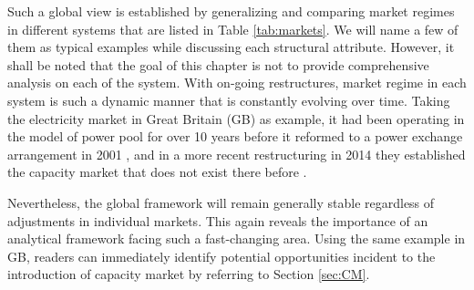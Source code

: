 Such a global view is established by generalizing and comparing market regimes in different systems that are listed in Table \ref{tab:markets}. We will name a few of them as typical examples while discussing each structural attribute. However, it shall be noted that the goal of this chapter is not to provide comprehensive analysis on each of the system. With on-going restructures, market regime in each system is such a dynamic manner that is constantly evolving over time. Taking the electricity market in Great Britain (GB) as example, it had been operating in the model of power pool for over 10 years before it reformed to a power exchange arrangement in 2001 \cite{Rebours2009,FrontierEconomics2016,ofgem_m}, and in a more recent restructuring in 2014 they established the capacity market that does not exist there before \cite{ofgem_cm}. 

Nevertheless, the global framework will remain generally stable regardless of adjustments in individual markets. This again reveals the importance of an analytical framework facing such a fast-changing area. Using the same example in GB, readers can immediately identify potential opportunities incident to the introduction of capacity market by referring to Section \ref{sec:CM}.


